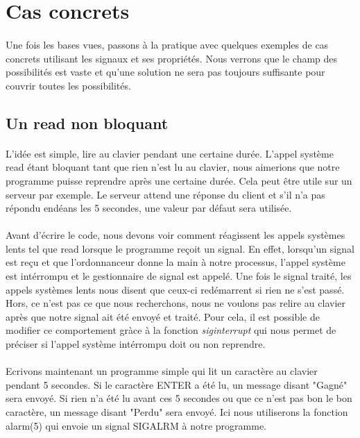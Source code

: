 \documentclass{article}
\begin{document}
\section{Cas concrets}

\paragraph{} Une fois les bases vues, passons à la pratique avec quelques exemples de cas concrets utilisant les signaux et ses propriétés. Nous verrons que le champ des possibilités
est vaste et qu'une solution ne sera pas toujours suffisante pour couvrir toutes les possibilités.

\subsection{Un read non bloquant}

\paragraph{} L'idée est simple, lire au clavier pendant une certaine durée. L'appel système read étant bloquant tant que rien n'est lu au clavier, nous aimerions que notre programme
puisse reprendre après une certaine durée. Cela peut être utile sur un serveur par exemple. Le serveur attend une réponse du client et s'il n'a pas répondu endéans les 5 secondes, 
une valeur par défaut sera utilisée.

\paragraph{} Avant d'écrire le code, nous devons voir comment réagissent les appels systèmes lents tel que read lorsque le programme reçoit un signal. En effet, lorsqu'un signal est 
reçu et que l'ordonnanceur donne la main à notre processus, l'appel système est intérrompu et le gestionnaire de signal est appelé. Une fois le signal traité, les appels systèmes
lents nous disent que ceux-ci redémarrent si rien ne s'est passé. Hors, ce n'est pas ce que nous recherchons, nous ne voulons pas relire au clavier après que notre signal ait été
envoyé et traité. Pour cela, il est possible de modifier ce comportement gràce à la fonction \textit{siginterrupt} qui nous permet de préciser si l'appel système intérrompu doit ou non reprendre.

\paragraph{} Ecrivons maintenant un programme simple qui lit un caractère au clavier pendant 5 secondes. Si le caractère ENTER a été lu, un message disant "Gagné" sera envoyé.
Si rien n'a été lu avant ces 5 secondes ou que ce n'est pas bon le bon caractère, un message disant "Perdu" sera envoyé. Ici nous utiliserons la fonction alarm(5) qui envoie 
un signal SIGALRM à notre programme.
\end{document}
